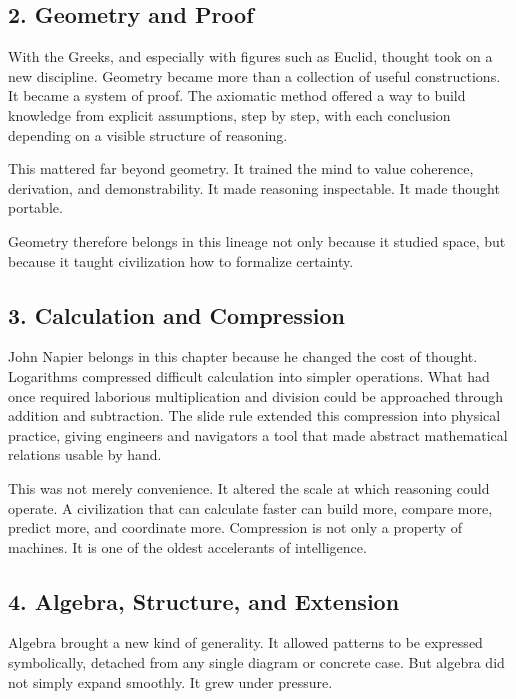 \documentclass[
]{article}
\begin{document}
\hypertarget{geometry-and-proof}{%
\subsection{2. Geometry and Proof}\label{geometry-and-proof}}

With the Greeks, and especially with figures such as Euclid, thought
took on a new discipline. Geometry became more than a collection of
useful constructions. It became a system of proof. The axiomatic method
offered a way to build knowledge from explicit assumptions, step by
step, with each conclusion depending on a visible structure of
reasoning.

This mattered far beyond geometry. It trained the mind to value
coherence, derivation, and demonstrability. It made reasoning
inspectable. It made thought portable.

Geometry therefore belongs in this lineage not only because it studied
space, but because it taught civilization how to formalize certainty.

\hypertarget{calculation-and-compression}{%
\subsection{3. Calculation and
Compression}\label{calculation-and-compression}}

John Napier belongs in this chapter because he changed the cost of
thought. Logarithms compressed difficult calculation into simpler
operations. What had once required laborious multiplication and division
could be approached through addition and subtraction. The slide rule
extended this compression into physical practice, giving engineers and
navigators a tool that made abstract mathematical relations usable by
hand.

This was not merely convenience. It altered the scale at which reasoning
could operate. A civilization that can calculate faster can build more,
compare more, predict more, and coordinate more. Compression is not only
a property of machines. It is one of the oldest accelerants of
intelligence.

\hypertarget{algebra-structure-and-extension}{%
\subsection{4. Algebra, Structure, and
Extension}\label{algebra-structure-and-extension}}

Algebra brought a new kind of generality. It allowed patterns to be
expressed symbolically, detached from any single diagram or concrete
case. But algebra did not simply expand smoothly. It grew under
pressure.
\end{document}
